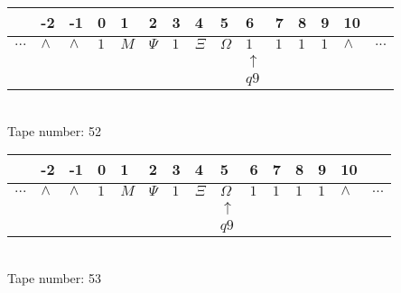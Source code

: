 \documentclass{article}
\begin{document}
\begin{table}[H]
\centering
\begin{tabular}{lllllllllllllll}
 & -2 & -1 & 0 & 1 & 2 & 3 & 4 & 5 & 6 & 7 & 8 & 9 & 10 & \\
\hline
$...$ & \multicolumn{1}{|l|}{$\wedge$} & \multicolumn{1}{|l|}{$\wedge$} & \multicolumn{1}{|l|}{$1$} & \multicolumn{1}{|l|}{$M$} & \multicolumn{1}{|l|}{$\Psi$} & \multicolumn{1}{|l|}{$1$} & \multicolumn{1}{|l|}{$\Xi$} & \multicolumn{1}{|l|}{$\Omega$} & \multicolumn{1}{|l|}{$1$} & \multicolumn{1}{|l|}{$1$} & \multicolumn{1}{|l|}{$1$} & \multicolumn{1}{|l|}{$1$} & \multicolumn{1}{|l|}{$\wedge$} & $...$\\
\hline
&  &  &  &  &  &  &  &  & $\uparrow$ &  &  &  &  &  \\
&  &  &  &  &  &  &  &  & $ q9 $ &  &  &  &  &  \\
\end{tabular}
\\
Tape number: 52
\noindent\makebox[\linewidth]{\hdashrule{\textwidth}{1pt}{1pt}}\end{table}

\begin{table}[H]
\centering
\begin{tabular}{lllllllllllllll}
 & -2 & -1 & 0 & 1 & 2 & 3 & 4 & 5 & 6 & 7 & 8 & 9 & 10 & \\
\hline
$...$ & \multicolumn{1}{|l|}{$\wedge$} & \multicolumn{1}{|l|}{$\wedge$} & \multicolumn{1}{|l|}{$1$} & \multicolumn{1}{|l|}{$M$} & \multicolumn{1}{|l|}{$\Psi$} & \multicolumn{1}{|l|}{$1$} & \multicolumn{1}{|l|}{$\Xi$} & \multicolumn{1}{|l|}{$\Omega$} & \multicolumn{1}{|l|}{$1$} & \multicolumn{1}{|l|}{$1$} & \multicolumn{1}{|l|}{$1$} & \multicolumn{1}{|l|}{$1$} & \multicolumn{1}{|l|}{$\wedge$} & $...$\\
\hline
&  &  &  &  &  &  &  & $\uparrow$ &  &  &  &  &  &  \\
&  &  &  &  &  &  &  & $ q9 $ &  &  &  &  &  &  \\
\end{tabular}
\\
Tape number: 53
\noindent\makebox[\linewidth]{\hdashrule{\textwidth}{1pt}{1pt}}\end{table}
\end{document}
